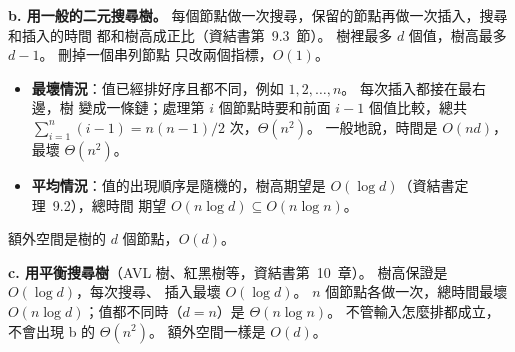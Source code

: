 \begin{pastsoln}
\textbf{b. 用一般的二元搜尋樹。} 每個節點做一次搜尋，保留的節點再做一次插入，搜尋和插入的時間
都和樹高成正比（資結書第~9.3~節）。 樹裡最多 $d$ 個值，樹高最多 $d - 1$。 刪掉一個串列節點
只改兩個指標，$O(1)$。
\begin{itemize}
\item \textbf{最壞情況}：值已經排好序且都不同，例如 $1, 2, \dots, n$。 每次插入都接在最右邊，樹
變成一條鏈；處理第 $i$ 個節點時要和前面 $i - 1$ 個值比較，總共
$\sum_{i=1}^{n} (i - 1) = n(n-1)/2$ 次，$\Theta(n^2)$。 一般地說，時間是 $O(nd)$，最壞
$\Theta(n^2)$。
\item \textbf{平均情況}：值的出現順序是隨機的，樹高期望是 $O(\log d)$（資結書定理~9.2），總時間
期望 $O(n \log d) \subseteq O(n \log n)$。
\end{itemize}
額外空間是樹的 $d$ 個節點，$O(d)$。

\textbf{c. 用平衡搜尋樹}（AVL 樹、紅黑樹等，資結書第~10~章）。 樹高保證是 $O(\log d)$，每次搜尋、
插入最壞 $O(\log d)$。 $n$ 個節點各做一次，總時間最壞 $O(n \log d)$；值都不同時（$d = n$）是
$\Theta(n \log n)$。 不管輸入怎麼排都成立，不會出現 b 的 $\Theta(n^2)$。 額外空間一樣是 $O(d)$。
\end{pastsoln}
